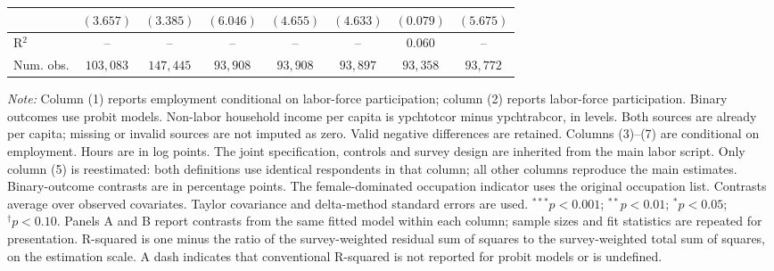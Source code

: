 \begin{table}[htpb!]
{\begin{tabular}{l c c c c c c c}
 & $(3.657)$ & $(3.385)$ & $(6.046)$ & $(4.655)$ & $(4.633)$ & $(0.079)$ & $(5.675)$ \\
\hline
R$^2$ & -- & -- & -- & -- & -- & $0.060$ & -- \\
Num. obs. & $103,083$ & $147,445$ & $93,908$ & $93,908$ & $93,897$ & $93,358$ & $93,772$ \\
\hline
\end{tabular}%
}
\par\vspace{1ex}
\begin{minipage}{\textwidth}\footnotesize\raggedright
\textit{Note:} Column (1) reports employment conditional on labor-force participation; column (2) reports labor-force participation. Binary outcomes use probit models. Non-labor household income per capita is ypchtotcor minus ypchtrabcor, in levels. Both sources are already per capita; missing or invalid sources are not imputed as zero. Valid negative differences are retained.  Columns (3)--(7) are conditional on employment. Hours are in log points. The joint specification, controls and survey design are inherited from the main labor script. Only column (5) is reestimated: both definitions use identical respondents in that column; all other columns reproduce the main estimates. Binary-outcome contrasts are in percentage points. The female-dominated occupation indicator uses the original occupation list. Contrasts average over observed covariates. Taylor covariance and delta-method standard errors are used. $^{***}p<0.001$; $^{**}p<0.01$; $^{*}p<0.05$; $^{\dagger}p<0.10$. Panels A and B report contrasts from the same fitted model within each column; sample sizes and fit statistics are repeated for presentation. R-squared is one minus the ratio of the survey-weighted residual sum of squares to the survey-weighted total sum of squares, on the estimation scale. A dash indicates that conventional R-squared is not reported for probit models or is undefined.
\end{minipage}
\end{table}
